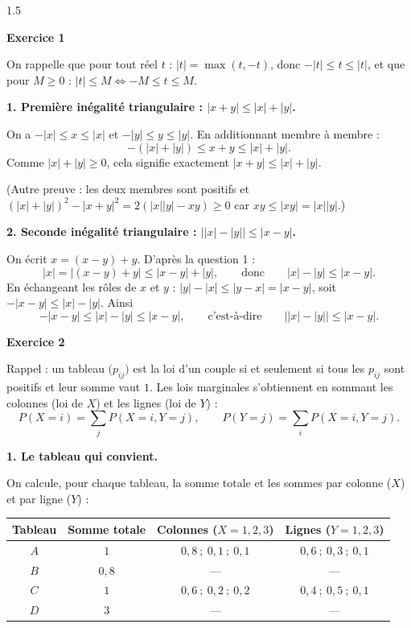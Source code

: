 \documentclass[12pt]{article}
\begin{document}
\begin{spacing}{1.5}

\textbf{Exercice 1}

On rappelle que pour tout réel $t$ : $|t|=\max(t,-t)$, donc $-|t|\le t\le|t|$, et que pour $M\ge0$ : $|t|\le M\iff -M\le t\le M$.

\textbf{1. Première inégalité triangulaire : $|x+y|\le|x|+|y|$.}

On a $-|x|\le x\le|x|$ et $-|y|\le y\le|y|$. En additionnant membre à membre :
\[
-(|x|+|y|)\le x+y\le|x|+|y| .
\]
Comme $|x|+|y|\ge0$, cela signifie exactement $|x+y|\le|x|+|y|$.

(Autre preuve : les deux membres sont positifs et $(|x|+|y|)^2-|x+y|^2=2(|x||y|-xy)\ge0$ car $xy\le|xy|=|x||y|$.)

\textbf{2. Seconde inégalité triangulaire : $\big||x|-|y|\big|\le|x-y|$.}

On écrit $x=(x-y)+y$. D'après la question 1 :
\[
|x|=|(x-y)+y|\le|x-y|+|y|,\qquad\text{donc}\qquad |x|-|y|\le|x-y| .
\]
En échangeant les rôles de $x$ et $y$ : $|y|-|x|\le|y-x|=|x-y|$, soit $-|x-y|\le|x|-|y|$. Ainsi
\[
-|x-y|\le|x|-|y|\le|x-y|,\qquad\text{c'est-à-dire}\qquad \big||x|-|y|\big|\le|x-y| .
\]

\medskip\textbf{Exercice 2}

Rappel : un tableau $\big(p_{ij}\big)$ est la loi d'un couple si et seulement si tous les $p_{ij}$ sont positifs et leur somme vaut $1$. Les lois marginales s'obtiennent en sommant les colonnes (loi de $X$) et les lignes (loi de $Y$) :
\[
P(X=i)=\sum_jP(X=i,Y=j),\qquad P(Y=j)=\sum_iP(X=i,Y=j).
\]

\textbf{1. Le tableau qui convient.}

On calcule, pour chaque tableau, la somme totale et les sommes par colonne ($X$) et par ligne ($Y$) :

\begin{center}
\small
\begin{tabular}{|c|c|c|c|}
\hline
Tableau & Somme totale & Colonnes ($X=1,2,3$) & Lignes ($Y=1,2,3$)\\
\hline
$A$ & $1$ & $0{,}8\ ;\ 0{,}1\ ;\ 0{,}1$ & $0{,}6\ ;\ 0{,}3\ ;\ 0{,}1$\\
\hline
$B$ & $0{,}8$ & --- & ---\\
\hline
$C$ & $1$ & $0{,}6\ ;\ 0{,}2\ ;\ 0{,}2$ & $0{,}4\ ;\ 0{,}5\ ;\ 0{,}1$\\
\hline
$D$ & $3$ & --- & ---\\
\hline
\end{tabular}
\end{center}


\end{spacing}
\end{document}
